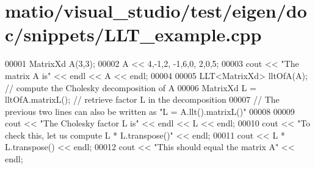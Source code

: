 \hypertarget{matio_2visual__studio_2test_2eigen_2doc_2snippets_2_l_l_t__example_8cpp_source}{}\section{matio/visual\+\_\+studio/test/eigen/doc/snippets/\+L\+L\+T\+\_\+example.cpp}
\label{matio_2visual__studio_2test_2eigen_2doc_2snippets_2_l_l_t__example_8cpp_source}

\begin{DoxyCode}
00001 MatrixXd A(3,3);
00002 A << 4,-1,2, -1,6,0, 2,0,5;
00003 cout << \textcolor{stringliteral}{"The matrix A is"} << endl << A << endl;
00004 
00005 LLT<MatrixXd> lltOfA(A); \textcolor{comment}{// compute the Cholesky decomposition of A}
00006 MatrixXd L = lltOfA.matrixL(); \textcolor{comment}{// retrieve factor L  in the decomposition}
00007 \textcolor{comment}{// The previous two lines can also be written as "L = A.llt().matrixL()"}
00008 
00009 cout << \textcolor{stringliteral}{"The Cholesky factor L is"} << endl << L << endl;
00010 cout << \textcolor{stringliteral}{"To check this, let us compute L * L.transpose()"} << endl;
00011 cout << L * L.transpose() << endl;
00012 cout << \textcolor{stringliteral}{"This should equal the matrix A"} << endl;
\end{DoxyCode}
